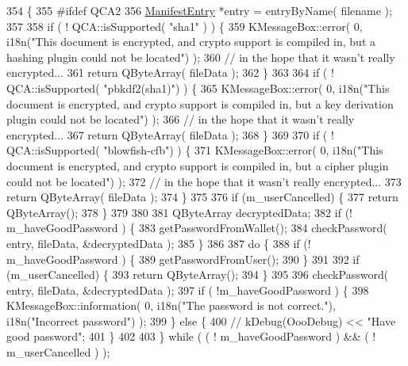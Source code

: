 \begin{DoxyCode}
354 \{
355 \textcolor{preprocessor}{#ifdef QCA2}
356   \hyperlink{classOOO_1_1ManifestEntry}{ManifestEntry} *entry = entryByName( filename );
357 
358   \textcolor{keywordflow}{if} ( ! QCA::isSupported( \textcolor{stringliteral}{"sha1"} ) ) \{
359     KMessageBox::error( 0, i18n(\textcolor{stringliteral}{"This document is encrypted, and crypto support is compiled in, but a
       hashing plugin could not be located"}) );
360     \textcolor{comment}{// in the hope that it wasn't really encrypted...}
361     \textcolor{keywordflow}{return} QByteArray( fileData );
362   \}
363 
364   \textcolor{keywordflow}{if} ( ! QCA::isSupported( \textcolor{stringliteral}{"pbkdf2(sha1)"}) )  \{
365     KMessageBox::error( 0, i18n(\textcolor{stringliteral}{"This document is encrypted, and crypto support is compiled in, but a key
       derivation plugin could not be located"}) );
366     \textcolor{comment}{// in the hope that it wasn't really encrypted...}
367     \textcolor{keywordflow}{return} QByteArray( fileData );
368   \}
369 
370   \textcolor{keywordflow}{if} ( ! QCA::isSupported( \textcolor{stringliteral}{"blowfish-cfb"}) )  \{
371     KMessageBox::error( 0, i18n(\textcolor{stringliteral}{"This document is encrypted, and crypto support is compiled in, but a
       cipher plugin could not be located"}) );
372     \textcolor{comment}{// in the hope that it wasn't really encrypted...}
373     \textcolor{keywordflow}{return} QByteArray( fileData );
374   \}
375 
376   \textcolor{keywordflow}{if} (m\_userCancelled) \{
377     \textcolor{keywordflow}{return} QByteArray();
378   \}
379 
380 
381   QByteArray decryptedData;
382   \textcolor{keywordflow}{if} (! m\_haveGoodPassword ) \{
383     getPasswordFromWallet();
384     checkPassword( entry, fileData, &decryptedData );
385   \}
386 
387   \textcolor{keywordflow}{do} \{
388     \textcolor{keywordflow}{if} (! m\_haveGoodPassword ) \{
389       getPasswordFromUser();
390     \}
391 
392     \textcolor{keywordflow}{if} (m\_userCancelled) \{
393       \textcolor{keywordflow}{return} QByteArray();
394     \}
395 
396     checkPassword( entry, fileData, &decryptedData );
397     \textcolor{keywordflow}{if} ( !m\_haveGoodPassword ) \{
398       KMessageBox::information( 0,  i18n(\textcolor{stringliteral}{"The password is not correct."}), i18n(\textcolor{stringliteral}{"Incorrect password"}) );
399     \} \textcolor{keywordflow}{else} \{
400       \textcolor{comment}{// kDebug(OooDebug) << "Have good password";}
401     \}
402 
403   \} \textcolor{keywordflow}{while} ( ( ! m\_haveGoodPassword ) && ( ! m\_userCancelled ) );

\end{DoxyCode}

